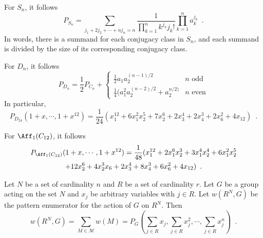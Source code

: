 \begin{example}
	For $S_n$, it follows
	\begin{equation}
		P_{S_n} = \sum_{j_1 + 2j_2 + \cdots + nj_n = n}
		\frac{1}{\prod_{k = 1}^n k^{j_k} j_k!} \prod_{k = 1}^n a_k^{j_k} \enspace.
	\end{equation}
	In words, there is a summand for each conjugacy class in $S_n$, and each
	summand is divided by the size of its corresponding conjugacy class.
\end{example}

\begin{example}
	For $D_n$, it follows
	\begin{equation}
		P_{D_n} = \frac{1}{2} P_{C_n} +
		\begin{cases}
			\frac{1}{2} a_1 a_2^{(n - 1) / 2} & n \text{ odd} \\
			\frac{1}{4} (a_1^2 a_2^{(n - 2) / 2} + a_2^{n / 2)} & n \text{ even}
		\end{cases}
	\end{equation}
	In particular,
	\begin{equation}
		P_{D_{24}}(1 + x, \cdots, 1 + x^{12}) = \frac{1}{24} ( x_1^{12} + 6 x_1^2 x_2^5 +
		7 x_2^6 + 2 x_3^4 + 2 x_4^3 + 2 x_6^2 + 4 x_{12} ) \enspace.
	\end{equation}
\end{example}

\begin{example}
	\cite[120]{FripertingerLackner2015}
	For $\Aff_1(C_{12})$, it follows
	\begin{multline}
		P_{\Aff_1(C_{12})}(1 + x, \cdots, 1 + x^{12}) = \frac{1}{48} (
		x_1^{12} + 2 x_1^6 x_2^3 + 3 x_1^4 x_2^4 + 6 x_1^2 x_2^5 \\ + 12 x_2^6 +
		4 x_2^3 x_6 + 2 x_3^4 + 8 x_4^3 + 6 x_6^2 + 4 x_{12} ) \enspace.
	\end{multline}
\end{example}

\begin{theorem}[Polya]
	\cite[88]{Aigner2007}
	\cite[256]{Tucker1974}
	Let $N$ be a set of cardinality $n$ and $R$ be a set of cardinality $r$. Let $G$ be
	a group acting on the set $N$ and $x_j$ be arbitrary variables with $j \in R$.
	Let $w(R^N, G)$ be the pattern enumerator for the action of $G$ on $R^N$. Then
	\begin{equation}
		w(R^N, G) = \sum_{M \in \mathcal{M}} w(M) = P_G(\sum_{j \in R} x_j,
		\sum_{j \in R} x_j^2, \cdots, \sum_{j \in R} x_j^n) \enspace.
	\end{equation}
\end{theorem}

